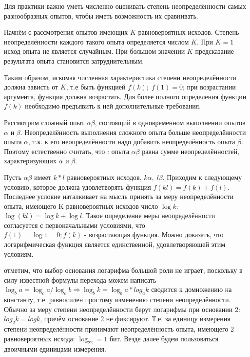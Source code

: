 ﻿\documentclass[a4paper,12pt]{report}
\begin{document}
	Для практики важно уметь численно оценивать степень неопределённости самых разнообразных опытов, чтобы иметь возможность их сравнивать. 
	
	Начнём с рассмотрения опытов имеющих $K$ равновероятных исходов. Степень неопределённости каждого такого опыта определяется числом $K$. При $K = 1$ исход опыта не является случайным. При большом значении $K$ предсказание результата опыта становится затруднительным.
	
	Таким образом, искомая численная характеристика степени неопределённости должна зависть от $K$, т.е быть функцией $f(k); \; f(1)=0$; при возрастании аргумента, функция должна возрастать. Для более полного определения функции $f(k)$ необходимо предъявить к ней дополнительные требования. 
	
	Рассмотрим сложный опыт $\alpha\beta$, состоящий в одновременном выполнении опытов $\alpha$ и $\beta$. Неопределённость выполнения сложного опыта больше неопределённости опыта $\alpha$, т.к. к его неопределённости надо добавить неопределённость опыта $\beta$. Поэтому естественно считать, что :  опыта $\alpha\beta$ равна сумме неопределённостей, характеризующих $\alpha$ и $\beta$.
	
	Пусть $\alpha \beta$ имеет $k*l$ равновероятных исходов, $k\alpha, \; l\beta$. Приходим к следующему условию, которое должна удовлетворять функция $f(kl) = f(k) + f(l)$. Последнее условие наталкивает на мысль принять за меру неопределённости опыта, имеющего K равновероятных исходов число $\log k$: $\log(kl) = \log k + \log l$. Такое определение меры неопределённости согласуется с первоначальными условиями, что $f(1) = \log1 = 0; f(k) \mbox{ - возрастающая функция}$. Можно доказать, что логарифмическая функция является единственной, удовлетворяющей этим условиям.


 	 отметим, что выбор основания логарифма большой роли не играет, поскольку в силу известной формулы перехода можем написать $\log_ba = \log_ca/\log_cb \Rightarrow \log_bk = \log_ba*log_ak$ сводится к домножению на константу, т.е. равносилен простому изменению  степени неопределённости. Обычно за меру степени неопределённости берут логарифмы при основании 2: $log_2k = logk$, причём основание 2 не фиксируют. Т.е. за единицу измерения степени неопределённости принимают неопределённость опыта, имеющего 2 равновероятных исхода: $\log_22 = 1$ бит. Везде далее будем пользоваться двоичными единицами измерения. 
\end{document}
